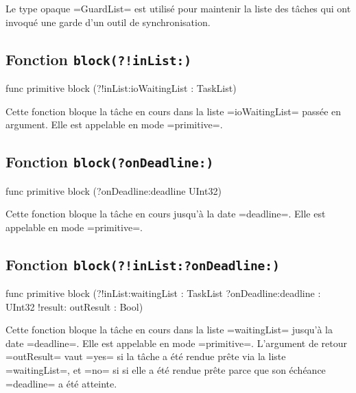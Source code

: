 Le type opaque \omnibus=GuardList= est utilisé pour maintenir la liste des tâches qui ont invoqué une garde d'un outil de synchronisation.



\subsection{Fonction \texttt{block(?!inList{}:)}}

\begin{OMNIBUS}
func primitive block (?!inList:ioWaitingList : TaskList)
\end{OMNIBUS}

Cette fonction bloque la tâche en cours dans la liste \omnibus=ioWaitingList= passée en argument. Elle est appelable en mode \omnibus=primitive=.




\subsection{Fonction \texttt{block(?onDeadline{}:)}}

\begin{OMNIBUS}
func primitive block (?onDeadline:deadline UInt32)
\end{OMNIBUS}

Cette fonction bloque la tâche en cours jusqu'à la date \omnibus=deadline=. Elle est appelable en mode \omnibus=primitive=.







\subsection{Fonction \texttt{block(?!inList{}:?onDeadline{}:)}}

\begin{OMNIBUS}
func primitive block (?!inList:waitingList : TaskList
                      ?onDeadline:deadline : UInt32
                      !result: outResult : Bool)
\end{OMNIBUS}

Cette fonction bloque la tâche en cours dans la liste \omnibus=waitingList= jusqu'à la date \omnibus=deadline=. Elle est appelable en mode \omnibus=primitive=. L'argument de retour \omnibus=outResult= vaut \omnibus=yes= si la tâche a été rendue prête via la liste \omnibus=waitingList=, et \omnibus=no= si si elle a été rendue prête parce que son échéance \omnibus=deadline= a été atteinte.









